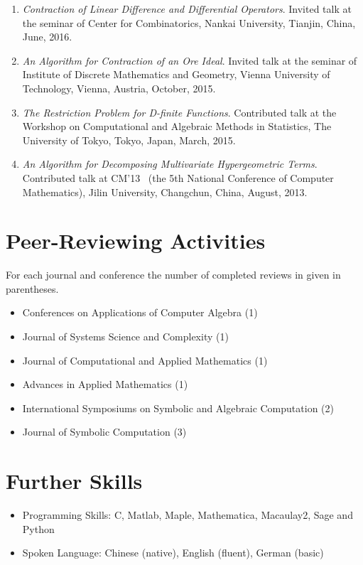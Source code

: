 \documentclass[a4paper,12pt]{article}
\begin{document}
\begin{enumerate}
 \item {\em Contraction of Linear Difference and Differential Operators}.
       Invited talk at the seminar of Center for Combinatorics, Nankai University, Tianjin, China, June, 2016.
 \item {\em An Algorithm for Contraction of an Ore Ideal}. Invited talk at the seminar of Institute of Discrete Mathematics and Geometry, 
       Vienna University of Technology, Vienna, Austria, October, 2015.
 \item {\em The Restriction Problem for D-finite Functions}. 
       Contributed talk at the Workshop on Computational and Algebraic Methods in Statistics,
       The University of Tokyo, Tokyo, Japan, March, 2015.
 \item {\em An Algorithm for Decomposing Multivariate Hypergeometric Terms}. Contributed talk at CM'13
       \ (the 5th National Conference of Computer Mathematics), Jilin University, Changchun, China, August, 2013.
\end{enumerate}

\section*{\Large Peer-Reviewing Activities}
For each journal and conference the number of completed reviews in given in parentheses.
\begin{itemize}
\item Conferences on Applications of Computer Algebra (1)
 \item Journal of Systems Science and Complexity (1)
 \item Journal of Computational and Applied Mathematics (1)
 \item Advances in Applied Mathematics (1)
 \item International Symposiums on Symbolic and Algebraic Computation (2)
 \item Journal of Symbolic Computation (3)
\end{itemize}

\section*{\Large{Further Skills}}
\begin{itemize}
 \item Programming Skills: C, Matlab, Maple, Mathematica, Macaulay2, Sage and Python
 \item Spoken Language: Chinese (native), English (fluent), German (basic)
\end{itemize}
\end{document}
